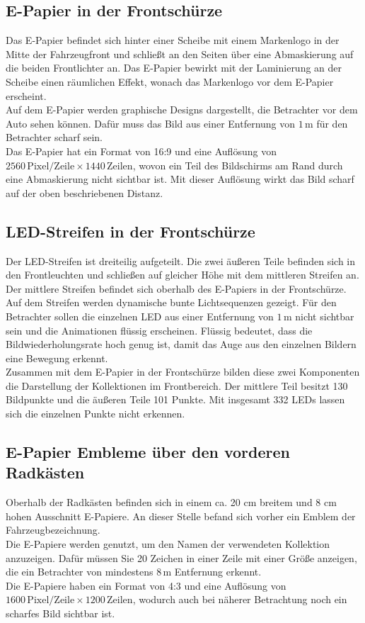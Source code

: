 \subsection{E-Papier in der Frontschürze}
Das E-Papier befindet sich hinter einer Scheibe mit einem Markenlogo in der Mitte der Fahrzeugfront und schließt an den Seiten über eine Abmaskierung auf die beiden Frontlichter an. Das E-Papier bewirkt mit der Laminierung an der Scheibe einen räumlichen Effekt, wonach das Markenlogo vor dem E-Papier erscheint. \\
Auf dem E-Papier werden graphische Designs dargestellt, die Betrachter vor dem Auto sehen können. Dafür muss das Bild aus einer Entfernung von $ 1\,\mathrm{m} $  für den Betrachter scharf sein. \\
Das E-Papier hat ein Format von 16:9 und eine Auflösung von  $ 2560\,\mathrm{Pixel}/\mathrm{Zeile} \times 1440\,\mathrm{Zeilen} $, wovon ein Teil des Bildschirms am Rand durch eine Abmaskierung nicht sichtbar ist. Mit dieser Auflösung wirkt das Bild scharf auf der oben beschriebenen Distanz.
\subsection{LED-Streifen in der Frontschürze}
Der LED-Streifen ist dreiteilig aufgeteilt. Die zwei äußeren Teile befinden sich in den Frontleuchten und schließen auf gleicher Höhe mit dem mittleren Streifen an. Der mittlere Streifen befindet sich oberhalb des E-Papiers in der Frontschürze. \\
Auf dem Streifen werden dynamische bunte Lichtsequenzen gezeigt. Für den Betrachter sollen die einzelnen LED aus einer Entfernung von $ 1\,\mathrm{m} $ nicht sichtbar sein und die Animationen flüssig erscheinen. Flüssig bedeutet, dass die Bildwiederholungsrate hoch genug ist, damit das Auge aus den einzelnen Bildern eine Bewegung erkennt. \\
Zusammen mit dem E-Papier in der Frontschürze bilden diese zwei
Komponenten die Darstellung der Kollektionen im Frontbereich. Der mittlere Teil besitzt 130 Bildpunkte und die äußeren Teile 101 Punkte. Mit insgesamt 332 LEDs lassen sich die einzelnen Punkte nicht erkennen.
\subsection{E-Papier Embleme über den vorderen Radkästen}
Oberhalb der Radkästen befinden sich in einem ca. 20 cm breitem und 8 cm hohen Ausschnitt E-Papiere. An dieser Stelle befand sich vorher ein Emblem der Fahrzeugbezeichnung. \\
Die E-Papiere werden genutzt, um den Namen der verwendeten Kollektion anzuzeigen. Dafür müssen Sie 20 Zeichen in einer Zeile mit einer Größe anzeigen, die ein Betrachter von mindestens $ 8\,\mathrm{m} $ Entfernung erkennt. \\
Die E-Papiere haben ein Format von 4:3 und eine Auflösung von $ 1600\,\mathrm{Pixel}/\mathrm{Zeile} \times 1200\,\mathrm{Zeilen} $, wodurch auch bei näherer Betrachtung noch ein scharfes Bild sichtbar ist.
